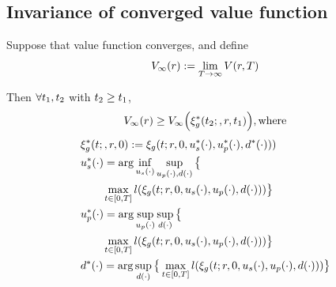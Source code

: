 \subsection{Invariance of converged value function}
 \begin{prop}
   \label{prop:main}
   Suppose that value function converges, and define
      \begin{equation}
      \label{eq:conv_valfunc}
      V_\infty(r) := \lim_{T\rightarrow\infty}V(r, T)
      \end{equation}
 
   Then $\forall t_1, t_2$ with $t_2 \ge t_1$,
   \begin{equation}
   \label{eq:invariant}
   V_\infty(r) \ge V_\infty\Big(\xi_g^*(t_2;, r, t_1)\Big), \text{where}
   \end{equation}
   \begin{equation}
   \begin{aligned}
   & \xi_g^*(t;, r, 0) := \xi_g(t; r, 0, u_s^*(\cdot), u_p^*(\cdot), d^*(\cdot))) \\
   & u_s^*(\cdot) = \arg \inf_{u_s(\cdot)} \sup_{u_p(\cdot), d(\cdot)}\big\{ \\
   & \qquad \max_{t \in [0, T]} l(\xi_g(t; r, 0, u_s(\cdot), u_p(\cdot), d(\cdot))) \big\}\\
   & u_p^*(\cdot) = \arg \sup_{u_p(\cdot)} \sup_{d(\cdot)} \big\{ \\
   & \qquad \max_{t \in [0, T]} l(\xi_g(t; r, 0, u_s(\cdot), u_p(\cdot), d(\cdot))) \big\} \\
   & d^*(\cdot) = \arg \sup_{d(\cdot)} \big\{\max_{t \in [0, T]} l(\xi_g(t; r, 0, u_s(\cdot), u_p(\cdot),  d(\cdot))) \big\}
   \end{aligned}
   \end{equation}
 \end{prop}

